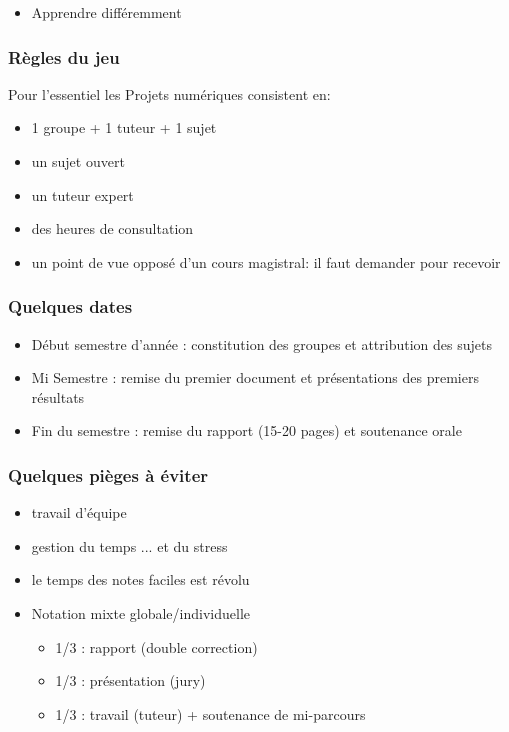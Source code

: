 \begin{appendix}
\begin{itemize}
\item Apprendre différemment
\end{itemize}

\subsubsection{Règles du jeu}
Pour l'essentiel les Projets numériques consistent en:
\begin{itemize}
\item 1 groupe + 1 tuteur + 1 sujet
\item un sujet ouvert
\item un tuteur expert
\item des heures de consultation
\item un point de vue opposé d’un cours magistral: il faut demander pour recevoir
\end{itemize}

\subsubsection{Quelques dates}
\begin{itemize}
\item Début semestre d'année : constitution des groupes et attribution des sujets
\item Mi Semestre : remise du premier document et présentations des premiers résultats 
\item Fin du semestre : remise du rapport (15-20 pages) et soutenance orale
\end{itemize}


\subsubsection{Quelques pièges à éviter}
\begin{itemize}
\item travail d'équipe
\item gestion du temps ... et du stress 
\item le temps des notes faciles est révolu
\item Notation mixte globale/individuelle
	\begin{itemize}
	\item 1/3 : rapport (double correction)
	\item 1/3 : présentation (jury)
	\item 1/3 : travail (tuteur) + soutenance de mi-parcours
	\end{itemize}
\end{itemize}



\end{appendix}
